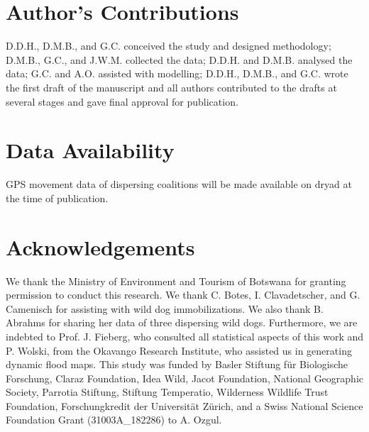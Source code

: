 \documentclass[abstract=on,10pt,a4paper,bibliography=totocnumbered]{article}
\begin{document}
\section{Author's Contributions}
D.D.H., D.M.B., and G.C. conceived the study and designed methodology; D.M.B.,
G.C., and J.W.M. collected the data; D.D.H. and D.M.B. analysed the data; G.C.
and A.O. assisted with modelling; D.D.H., D.M.B., and G.C. wrote the first draft
of the manuscript and all authors contributed to the drafts at several stages
and gave final approval for publication.

\section{Data Availability}
GPS movement data of dispersing coalitions will be made available on dryad at
the time of publication.

\section{Acknowledgements}
We thank the Ministry of Environment and Tourism of Botswana for granting
permission to conduct this research. We thank C. Botes, I. Clavadetscher, and G.
Camenisch for assisting with wild dog immobilizations. We also thank B. Abrahms
for sharing her data of three dispersing wild dogs. Furthermore, we are indebted
to Prof. J. Fieberg, who consulted all statistical aspects of this work and P.
Wolski, from the Okavango Research Institute, who assisted us in generating
dynamic flood maps. This study was funded by Basler Stiftung für Biologische
Forschung, Claraz Foundation, Idea Wild, Jacot Foundation, National Geographic
Society, Parrotia Stiftung, Stiftung Temperatio, Wilderness Wildlife Trust
Foundation, Forschungkredit der Universität Zürich, and a Swiss National Science
Foundation Grant (31003A\_182286) to A. Ozgul.

\newpage
\begingroup
\singlespacing

\endgroup
\end{document}
